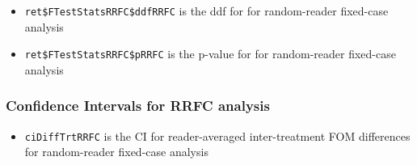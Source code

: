 \documentclass[
]{book}
\newenvironment{Shaded}{\begin{snugshade}}{\end{snugshade}}
\newcommand{\CommentTok}[1]{\textcolor[rgb]{0.56,0.35,0.01}{\textit{#1}}}
\newcommand{\NormalTok}[1]{#1}
\newcommand{\OperatorTok}[1]{\textcolor[rgb]{0.81,0.36,0.00}{\textbf{#1}}}
\providecommand{\tightlist}{%
  \setlength{\itemsep}{0pt}\setlength{\parskip}{0pt}}
\begin{document}
\begin{itemize}
\tightlist
\item
  \texttt{ret\$FTestStatsRRFC\$ddfRRFC} is the ddf for for random-reader fixed-case analysis
\end{itemize}

\begin{Shaded}
\end{Shaded}

\begin{itemize}
\tightlist
\item
  \texttt{ret\$FTestStatsRRFC\$pRRFC} is the p-value for for random-reader fixed-case analysis
\end{itemize}

\begin{Shaded}
\end{Shaded}

\hypertarget{confidence-intervals-for-rrfc-analysis}{%
\subsubsection{Confidence Intervals for RRFC analysis}\label{confidence-intervals-for-rrfc-analysis}}

\begin{itemize}
\tightlist
\item
  \texttt{ciDiffTrtRRFC} is the CI for reader-averaged inter-treatment FOM differences for random-reader fixed-case analysis
\end{itemize}

\begin{Shaded}
\end{Shaded}
\end{document}
